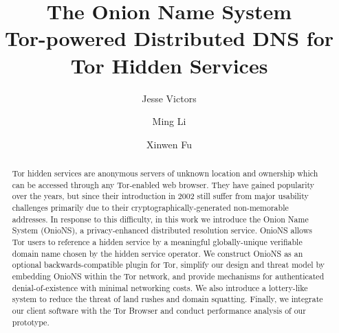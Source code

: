 \documentclass[USenglish,oneside,twocolumn]{article}
\begin{document}
\author[1]{Jesse Victors}
\author[2]{Ming Li}
\author[3]{Xinwen Fu}


\title{\huge The Onion Name System \large \\ Tor-powered Distributed DNS for Tor Hidden Services}

\begin{abstract} {
Tor hidden services are anonymous servers of unknown location and ownership which can be accessed through any Tor-enabled web browser. They have gained popularity over the years, but since their introduction in 2002 still suffer from major usability challenges primarily due to their cryptographically-generated non-memorable addresses. \newline \hspace*{1em} In response to this difficulty, in this work we introduce the Onion Name System (OnioNS), a privacy-enhanced distributed resolution service. OnioNS allows Tor users to reference a hidden service by a meaningful globally-unique verifiable domain name chosen by the hidden service operator. We construct OnioNS as an optional backwards-compatible plugin for Tor, simplify our design and threat model by embedding OnioNS within the Tor network, and provide mechanisms for authenticated denial-of-existence with minimal networking costs. We also introduce a lottery-like system to reduce the threat of land rushes and domain squatting. Finally, we integrate our client software with the Tor Browser and conduct performance analysis of our prototype. %
}
\end{abstract}
  
\end{document}
